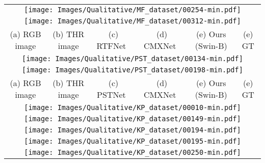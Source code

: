\documentclass[10pt,twocolumn,letterpaper]{article}
\begin{document}
 \begin{figure*}[t]
\begin{center}
{
\begin{tabular}{c@{\hskip 0.005\linewidth}c@{\hskip 0.005\linewidth}c@{\hskip 0.005\linewidth}c@{\hskip 0.005\linewidth}c@{\hskip 0.005\linewidth}c}
\multicolumn{6}{c}{\texttt{[image: Images/Qualitative/MF\_dataset/00254-min.pdf]}} \vspace{-0.02in} \\
\multicolumn{6}{c}{\texttt{[image: Images/Qualitative/MF\_dataset/00312-min.pdf]}} \vspace{-0.02in} \\
{\footnotesize (a) RGB image} & {\footnotesize (b) THR image} & {\footnotesize (c) RTFNet~\cite{sun2019rtfnet} } & {\footnotesize (d) CMXNet~\cite{liu2022cmx}} &  {\footnotesize (e) Ours (Swin-B)} &  {\footnotesize (e) GT}  \\ 
\multicolumn{6}{c}{\texttt{[image: Images/Qualitative/PST\_dataset/00134-min.pdf]}} \vspace{-0.02in} \\
\multicolumn{6}{c}{\texttt{[image: Images/Qualitative/PST\_dataset/00198-min.pdf]}} \vspace{-0.02in} \\
{\footnotesize (a) RGB image} & {\footnotesize (b) THR image} & {\footnotesize (c) PSTNet~\cite{shivakumar2019pst900} } & {\footnotesize (d) CMXNet~\cite{liu2022cmx}} &  {\footnotesize (e) Ours (Swin-B)} &  {\footnotesize (e) GT}  \\ 
\multicolumn{6}{c}{\texttt{[image: Images/Qualitative/KP\_dataset/00010-min.pdf]}} \vspace{-0.02in} \\
\multicolumn{6}{c}{\texttt{[image: Images/Qualitative/KP\_dataset/00149-min.pdf]}} \vspace{-0.02in} \\
\multicolumn{6}{c}{\texttt{[image: Images/Qualitative/KP\_dataset/00194-min.pdf]}} \vspace{-0.02in} \\ \multicolumn{6}{c}{\texttt{[image: Images/Qualitative/KP\_dataset/00195-min.pdf]}} \vspace{-0.02in} \\
\multicolumn{6}{c}{\texttt{[image: Images/Qualitative/KP\_dataset/00250-min.pdf]}} \vspace{-0.02in} \\

\end{tabular}}
\end{center}
\end{figure*}
\end{document}
